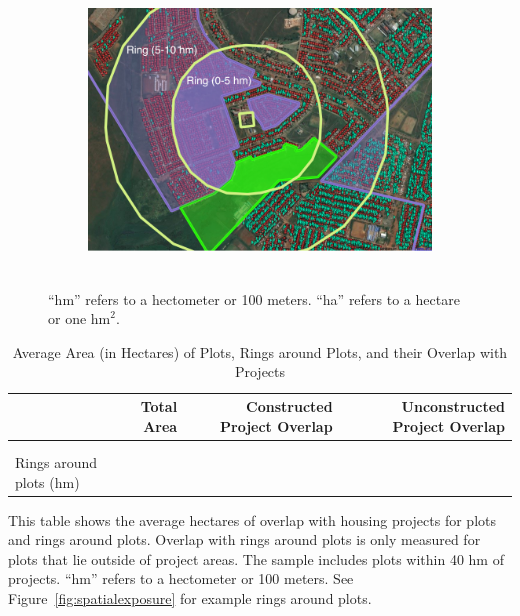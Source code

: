 \documentclass[12pt]{article}
\newcommand{\hmref}{
	``hm'' refers to a hectometer or 100 meters.
}
\newcommand{\hmrefha}{
	``hm'' refers to a hectometer or 100 meters. ``ha'' refers to a hectare or one $\text{hm}^{2}$.
}
\begin{document}
\begin{figure}[hbtp]
\begin{subfigure}[b]{.8\textwidth}
        \includegraphics[width=\textwidth,trim={.2cm .2cm .2cm 0cm}, clip=true]{figures/hm_spill_75.png}
        \label{fig:outsideproj}
    \end{subfigure}\\
    {\footnotesize \hmrefha}
\end{figure} 



\begin{table}
\small
\centering
\caption{Average Area (in Hectares) of Plots, Rings around Plots, and their Overlap with Projects}\label{table:spatialsummary}
\vspace{-2mm}
\begin{threeparttable}
\begin{tabular}{lrrr}
\toprule
& \multicolumn{1}{G}{Total Area} & \multicolumn{1}{G}{Constructed Project Overlap} &\multicolumn{1}{G}{Unconstructed Project Overlap} \\
\midrule
\\[-.7em]

\\[-.5em]
\hspace{2em}Rings around plots (hm)   \\

\bottomrule
\end{tabular}
\begin{tablenotes}
\item \footnotesize  This table shows the average hectares of overlap with housing projects for plots and rings around plots.  Overlap with rings around plots is only measured for plots that lie outside of project areas.  The sample includes plots within 40 hm of projects. \hmref  See Figure~\ref{fig:spatialexposure} for example rings around plots.
\end{tablenotes}
\end{threeparttable}
\end{table}
\end{document}
